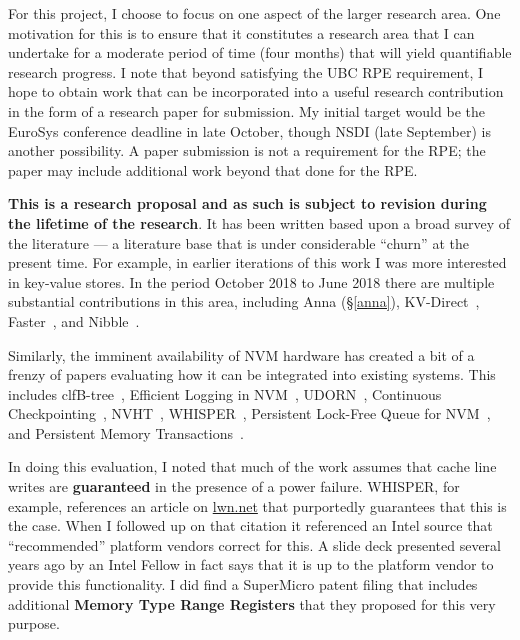 \documentclass[letterpaper,twocolumn,10pt]{article}
\begin{document}
For this project, I choose to focus on one aspect of the larger research area.  One motivation for this is to ensure that it constitutes a research
area that I can undertake for a moderate period of time (four months) that will yield quantifiable research progress.  I note that beyond satisfying
the UBC RPE requirement, I hope to obtain work that can be incorporated into a useful research contribution in the form of a research paper for
submission.  My initial target would be the EuroSys conference deadline in late October, though NSDI (late September) is another possibility.  A
paper submission is not a requirement for the RPE; the paper may include additional work beyond that done for the RPE.

\textbf{This is a research proposal and as such is subject to revision during the lifetime of the research}.
It has been written based upon a broad survey of the literature --- a literature base that is under
considerable ``churn'' at the present time.  For example, in earlier iterations of this work I was
more interested in key-value stores.  In the period October 2018 to June 2018 there are multiple substantial
contributions in this area, including Anna (\S \ref{anna}), KV-Direct~\cite{Li:2017:KHI:3132747.3132756}, 
Faster~\cite{chandramouli2018Faster}, and Nibble~\cite{merritt2017concurrent}.

Similarly, the imminent availability of NVM hardware has created a bit of a frenzy of papers evaluating how
it can be integrated into existing systems.  This includes clfB-tree~\cite{kim2018clfb}, Efficient Logging in 
NVM~\cite{Cohen:2017:ELN:3152284.3133891}, UDORN~\cite{chen2017udorn}, Continuous Checkpointing~\cite{giles2017continuous},
NVHT~\cite{zhou2016nvht}, WHISPER~\cite{Nalli:2017:APM:3093337.3037730}, Persistent Lock-Free Queue for NVM~\cite{Friedman:2018:PLQ:3178487.3178490},
and Persistent Memory Transactions~\cite{marathe2018persistent}.

In doing this evaluation, I noted that much of the work assumes that cache line writes are \textbf{guaranteed} in the presence of a power failure.
WHISPER, for example, references an article on \url{lwn.net} that purportedly guarantees that this is the case.  When I followed up on that citation
it referenced an Intel source that ``recommended'' platform vendors correct for this. A slide deck presented several years ago by an Intel Fellow
in fact says that it is up to the platform vendor to provide this functionality.  I did find a SuperMicro patent filing that includes additional
\textbf{Memory Type Range Registers} that they proposed for this very purpose.
\end{document}
